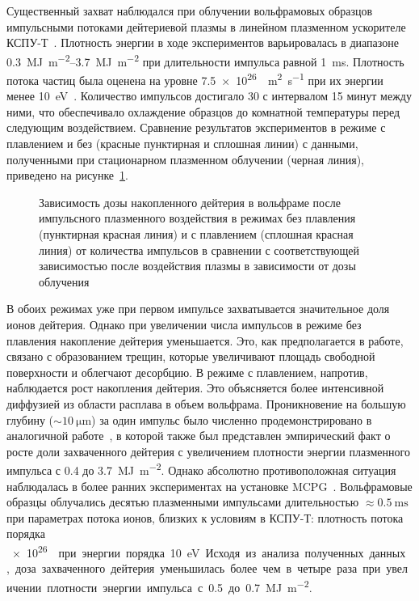Существенный захват наблюдался при облучении вольфрамовых образцов импульсными потоками дейтериевой плазмы в линейном плазменном ускорителе КСПУ-Т~\cite{Ogorodnikova}. Плотность энергии в ходе экспериментов варьировалась в диапазоне \SIrange{0.3}{3.7}{\mega\joule\per\meter\squared} при длительности импульса равной \SI{1}{\milli\second}. Плотность потока частиц была оценена на уровне \SI{7.5e26}{\per\meter\squared\per\second} при их энергии менее \SI{10}{\electronvolt}~\cite{Poskakalov2020}. Количество импульсов достигало 30 с интервалом 15 минут между ними, что обеспечивало охлаждение образцов до комнатной температуры перед следующим воздействием. Сравнение результатов экспериментов в режиме с плавлением и без (красные пунктирная и сплошная линии) с данными, полученными при стационарном плазменном облучении (черная линия), приведено на рисунке~\cref{fig:ch1/retention_QSPA}. 
\begin{figure}[ht]
    \caption{Зависимость дозы накопленного дейтерия в вольфраме после импульсного плазменного воздействия в режимах без плавления (пунктирная красная линия) и с плавлением (сплошная красная линия) от количества импульсов в сравнении с соответствующей зависимостью после воздействия плазмы в зависимости от дозы облучения~\cite{Ogorodnikova}}\label{fig:ch1/retention_QSPA}
\end{figure}
В обоих режимах уже при первом импульсе захватывается значительное доля ионов дейтерия. Однако при увеличении числа импульсов в режиме без плавления накопление дейтерия уменьшается. Это, как предполагается в работе, связано с образованием трещин, которые увеличивают площадь свободной поверхности и облегчают десорбцию. В режиме с плавлением, напротив, наблюдается рост накопления дейтерия. Это объясняется более интенсивной диффузией из области расплава в объем вольфрама. Проникновение на большую глубину (\( \sim \SI{10}{\micro\meter} \)) за один импульс было численно продемонстрировано в аналогичной работе~\cite{Poskakalov2020}, в которой также был представлен эмпирический факт о росте доли захваченного дейтерия с увеличением плотности энергии плазменного импульса с \num{0.4} до \SI{3.7}{\mega\joule\per\metre\squared}. Однако абсолютно противоположная ситуация наблюдалась в более ранних экспериментах на установке MCPG~\cite{Nishijima2011}. Вольфрамовые образцы облучались десятью плазменными импульсами длительностью \( \approx\SI{0.5}{\milli\second} \) при параметрах потока ионов, близких к условиям в КСПУ-Т: плотность потока порядка \SI{e26}{\per\meter\square\per\second} при энергии порядка \SI{10}{\electronvolt}. Исходя из анализа полученных данных, доза захваченного дейтерия уменьшилась более чем в четыре раза при увеличении плотности энергии импульса с \num{0.5} до \SI{0.7}{\mega\joule\per\meter\squared}.

